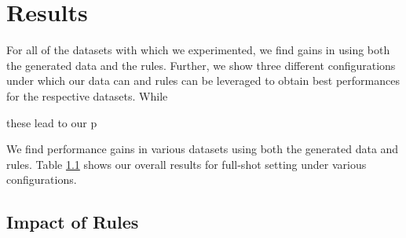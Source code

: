 









\section{Results}

For all of the datasets with which we experimented, we find gains in using both the generated data and the rules. Further, we show three different configurations under which our data can and rules can be leveraged to obtain best performances for the respective datasets. While 

these lead to our p


We find performance gains in various datasets using both the generated data and rules. Table \ref{} shows our overall results for full-shot setting under various configurations. 

\subsection{Impact of Rules}


